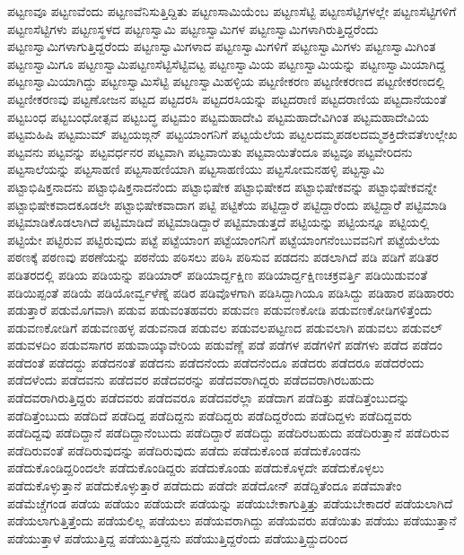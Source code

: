 {ಪಟ್ಟಣವೂ
ಪಟ್ಟಣವೆಂದು
ಪಟ್ಟಣವೆನಿಸುತ್ತಿದ್ದಿತು
ಪಟ್ಟಣಸಾಮಿಯೆಂಬ
ಪಟ್ಟಣಸೆಟ್ಟಿ
ಪಟ್ಟಣಸೆಟ್ಟಿಗಳಲ್ಲೇ
ಪಟ್ಟಣಸೆಟ್ಟಿಗಳಿಗೆ
ಪಟ್ಟಣಸೆಟ್ಟಿಗಳು
ಪಟ್ಟಣಸ್ಥಳದ
ಪಟ್ಟಣಸ್ವಾಮಿ
ಪಟ್ಟಣಸ್ವಾಮಿಗಳ
ಪಟ್ಟಣಸ್ವಾಮಿಗಳಾಗಿರುತ್ತಿದ್ದರೆಂದು
ಪಟ್ಟಣಸ್ವಾಮಿಗಳಾಗುತ್ತಿದ್ದರೆಂದು
ಪಟ್ಟಣಸ್ವಾಮಿಗಳಾದ
ಪಟ್ಟಣಸ್ವಾಮಿಗಳಿಗೆ
ಪಟ್ಟಣಸ್ವಾಮಿಗಳು
ಪಟ್ಟಣಸ್ವಾಮಿಗಿಂತ
ಪಟ್ಟಣಸ್ವಾಮಿಗೂ
ಪಟ್ಟಣಸ್ವಾಮಿಪಟ್ಟಣಸೆಟ್ಟಿಸೆಟ್ಟಿವಟ್ಟ
ಪಟ್ಟಣಸ್ವಾಮಿಯ
ಪಟ್ಟಣಸ್ವಾಮಿಯನ್ನು
ಪಟ್ಟಣಸ್ವಾಮಿಯಾಗಿದ್ದ
ಪಟ್ಟಣಸ್ವಾಮಿಯಾಗಿದ್ದು
ಪಟ್ಟಣಸ್ವಾಮಿಸೆಟ್ಟಿ
ಪಟ್ಟಣಸ್ವಾಮಿಹಳ್ಳಿಯ
ಪಟ್ಟಣೀಕರಣ
ಪಟ್ಟಣೀಕರಣದ
ಪಟ್ಟಣೀಕರಣದಲ್ಲಿ
ಪಟ್ಟಣೀಕರಣವು
ಪಟ್ಟಣೋಜನ
ಪಟ್ಟದ
ಪಟ್ಟದರಸಿ
ಪಟ್ಟದರಸಿಯನ್ನು
ಪಟ್ಟದರಾಣಿ
ಪಟ್ಟದರಾಣಿಯ
ಪಟ್ಟದಾನೆಯಂತೆ
ಪಟ್ಟಬಂಧ
ಪಟ್ಟಬಂಧೋತ್ಸವ
ಪಟ್ಟಬದ್ಧ
ಪಟ್ಟಮಂ
ಪಟ್ಟಮಹಾದೇವಿ
ಪಟ್ಟಮಹಾದೇವಿಗಿಂತ
ಪಟ್ಟಮಹಾದೇವಿಯ
ಪಟ್ಟಮಹಿಷಿ
ಪಟ್ಟಮುಮ್
ಪಟ್ಟಯಙ್ಗನ್
ಪಟ್ಟಯಾಂಗನಿಗೆ
ಪಟ್ಟಯೆಲೆಯ
ಪಟ್ಟಲದಮ್ಮಪಡಲದಮ್ಮಶಕ್ತಿದೇವತೆಉಲ್ಲೇಖ
ಪಟ್ಟವನು
ಪಟ್ಟವನ್ನು
ಪಟ್ಟವರ್ಧನರ
ಪಟ್ಟವಾಗಿ
ಪಟ್ಟವಾಯಿತು
ಪಟ್ಟವಾಯಿತೆಂದೂ
ಪಟ್ಟವೂ
ಪಟ್ಟವೇರಿದನು
ಪಟ್ಟಸಾಲೆಯನ್ನು
ಪಟ್ಟಸಾಹಣಿ
ಪಟ್ಟಸಾಹಣಿಯಾಗಿ
ಪಟ್ಟಸಾಹಣಿಯು
ಪಟ್ಟಸೋಮನಹಳ್ಳಿ
ಪಟ್ಟಸ್ವಾಮಿ
ಪಟ್ಟಾಭಿಷಿಕ್ತನಾದನು
ಪಟ್ಟಾಭಿಷಿಕ್ತನಾದನೆಂದು
ಪಟ್ಟಾಭಿಷೇಕ
ಪಟ್ಟಾಭಿಷೇಕದ
ಪಟ್ಟಾಭಿಷೇಕವನ್ನು
ಪಟ್ಟಾಭಿಷೇಕವನ್ನೇ
ಪಟ್ಟಾಭಿಷೇಕವಾದಕೂಡಲೇ
ಪಟ್ಟಾಭಿಷೇಕವಾದಾಗ
ಪಟ್ಟಿ
ಪಟ್ಟಿಕೆಯ
ಪಟ್ಟಿದ್ದಾರೆ
ಪಟ್ಟಿದ್ದಾರೆಂದು
ಪಟ್ಟಿದ್ದಾರೆೆ
ಪಟ್ಟಿಮಾಡಿ
ಪಟ್ಟಿಮಾಡಿಕೊಡಲಾಗಿದೆ
ಪಟ್ಟಿಮಾಡಿದೆ
ಪಟ್ಟಿಮಾಡಿದ್ದಾರೆ
ಪಟ್ಟಿಮಾಡುತ್ತದೆ
ಪಟ್ಟಿಯನ್ನು
ಪಟ್ಟಿಯನ್ನೂ
ಪಟ್ಟಿಯಲ್ಲಿ
ಪಟ್ಟಿಯೇ
ಪಟ್ಟಿರುವ
ಪಟ್ಟಿರುವುದು
ಪಟ್ಟೆ
ಪಟ್ಟೆಯಾಂಗ
ಪಟ್ಟೆಯಾಂಗನಿಗೆ
ಪಟ್ಟೆಯಾಂಗನೆಂಬುವವನಿಗೆ
ಪಟ್ಟೆಯೆಲೆಯ
ಪಠಣಕ್ಕೆ
ಪಠಣವು
ಪಠಣೆಯನ್ನು
ಪಠನೆಯ
ಪಠಿಸಲು
ಪಠಿಸಿ
ಪಠಿಸುವ
ಪಡದನು
ಪಡಲಾಗಿದೆ
ಪಡಿ
ಪಡಿಗೆ
ಪಡಿತರ
ಪಡಿತರದಲ್ಲಿ
ಪಡಿಯ
ಪಡಿಯನ್ನು
ಪಡಿಯಾರ್
ಪಡಿಯಾರ್ದ್ದಕ್ಷಿಣ
ಪಡಿಯಾರ್ದ್ದಕ್ಷಿಣಚಕ್ರವರ್ತ್ತಿ
ಪಡಿಯಿಡುವಂತೆ
ಪಡಿಯಿಪ್ಪಂತೆ
ಪಡಿಯೆ
ಪಡಿಯೋರ್ವ್ವಳೆಣ್ನೆ
ಪಡಿರ
ಪಡಿವೊಳಗಾಗಿ
ಪಡಿಸಿದ್ದಾಗಿಯೂ
ಪಡಿಸಿದ್ದು
ಪಡಿಹಾರ
ಪಡಿಹಾರರು
ಪಡುತ್ತಾರೆ
ಪಡುಮೊಗವಾಗಿ
ಪಡುವ
ಪಡುವಂತಹವರು
ಪಡುವಣ
ಪಡುವಣಕೋಡಿ
ಪಡುವಣಕೋಡಿಗಳಿತ್ತೆಂದು
ಪಡುವಣಕೋಡಿಗೆ
ಪಡುವಣಹಳ್ಳ
ಪಡುವನಾಡ
ಪಡುವಲ
ಪಡುವಲಪಟ್ಟಣದ
ಪಡುವಲಾಗಿ
ಪಡುವಲು
ಪಡುವಲ್
ಪಡುವಳದಿಂ
ಪಡುವಸಾಗರ
ಪಡುವಾಯ್ಕಾವೇರಿಯ
ಪಡುವೆಣ್ಣೆ
ಪಡೆ
ಪಡೆಗಳ
ಪಡೆಗಳಿಗೆ
ಪಡೆಗಳು
ಪಡೆದ
ಪಡೆದಂ
ಪಡೆದಂತೆ
ಪಡೆದದ್ದು
ಪಡೆದನಂತೆ
ಪಡೆದನು
ಪಡೆದನೆಂದು
ಪಡೆದನೆಂದೂ
ಪಡೆದರು
ಪಡೆದರೂ
ಪಡೆದರೆಂದು
ಪಡೆದಳೆಂದು
ಪಡೆದವನು
ಪಡೆದವರ
ಪಡೆದವರನ್ನು
ಪಡೆದವರಾಗಿದ್ದರು
ಪಡೆದವರಾಗಿರಬಹುದು
ಪಡೆದವರಾಗಿರುತ್ತಿದ್ದರು
ಪಡೆದವರು
ಪಡೆದವರೂ
ಪಡೆದವರೆಲ್ಲಾ
ಪಡೆದಾಗ
ಪಡೆದಿತ್ತು
ಪಡೆದಿತ್ತೆಂಬುದನ್ನು
ಪಡೆದಿತ್ತೆಂಬುದು
ಪಡೆದಿದೆ
ಪಡೆದಿದ್ದ
ಪಡೆದಿದ್ದನು
ಪಡೆದಿದ್ದರು
ಪಡೆದಿದ್ದರೆಂದು
ಪಡೆದಿದ್ದಳು
ಪಡೆದಿದ್ದವರು
ಪಡೆದಿದ್ದವು
ಪಡೆದಿದ್ದಾನೆ
ಪಡೆದಿದ್ದಾನೆಂಬುದು
ಪಡೆದಿದ್ದಾರೆ
ಪಡೆದಿದ್ದು
ಪಡೆದಿರಬಹುದು
ಪಡೆದಿರುತ್ತಾನೆ
ಪಡೆದಿರುವ
ಪಡೆದಿರುವಂತೆ
ಪಡೆದಿರುವುದನ್ನು
ಪಡೆದಿರುವುದು
ಪಡೆದು
ಪಡೆದುಕೊಂಡ
ಪಡೆದುಕೊಂಡನು
ಪಡೆದುಕೊಂಡಿದ್ದರಿಂದಲೇ
ಪಡೆದುಕೊಂಡಿದ್ದರು
ಪಡೆದುಕೊಂಡು
ಪಡೆದುಕೊಳ್ಳದೇ
ಪಡೆದುಕೊಳ್ಳಲು
ಪಡೆದುಕೊಳ್ಳುತ್ತಾನೆ
ಪಡೆದುಕೊಳ್ಳುತ್ತಾರೆ
ಪಡೆದುದು
ಪಡೆದೇ
ಪಡೆದೋನ್
ಪಡೆದ್ದಿತೆಂದೂ
ಪಡೆಮಾತೇಂ
ಪಡೆಮೆಚ್ಚೆಗಂಡ
ಪಡೆಯ
ಪಡೆಯಂ
ಪಡೆಯದೇ
ಪಡೆಯನ್ನು
ಪಡೆಯಬೇಕಾಗುತ್ತಿತ್ತು
ಪಡೆಯಬೇಕಾದರೆ
ಪಡೆಯಲಾಗಿದೆ
ಪಡೆಯಲಾಗುತ್ತಿತ್ತೆಂದು
ಪಡೆಯಲಿಲ್ಲ
ಪಡೆಯಲು
ಪಡೆಯವರಾಗಿದ್ದು
ಪಡೆಯವರು
ಪಡೆಯಿತು
ಪಡೆಯು
ಪಡೆಯುತ್ತಾನೆ
ಪಡೆಯುತ್ತಾಳೆ
ಪಡೆಯುತ್ತಿದ್ದ
ಪಡೆಯುತ್ತಿದ್ದನು
ಪಡೆಯುತ್ತಿದ್ದರೆಂದು
ಪಡೆಯುತ್ತಿದ್ದುದರಿಂದ
}
